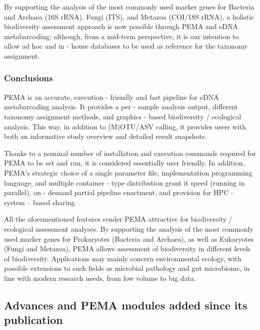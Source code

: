       By supporting the analysis of the most commonly used marker genes for Bacteria and Archaea (16S rRNA), Fungi (ITS), and Metazoa (COI/18S rRNA), a holistic biodiversity assessment approach is now possible through PEMA and eDNA metabarcoding; although, from a mid-term perspective, it is our intention to allow ad hoc and in - house databases to be used as reference for the taxonomy assignment.

   \subsubsection*{Conclusions}
   \label{subsec:pema-conclusion}

      PEMA is an accurate, execution - friendly and fast pipeline for eDNA metabarcoding analysis. 
      It provides a per - sample analysis output, different taxonomy assignment methods, and graphics - based biodiversity / ecological analysis. 
      This way, in addition to (M)OTU/ASV calling, it provides users with both an informative study overview and detailed result snapshots.

      Thanks to a nominal number of installation and execution commands required for PEMA to be set and run, it is considered essentially user friendly. 
      In addition, PEMA's strategic choice of a single parameter file, implementation programming language, and multiple container - type distribution grant it speed (running in parallel), on - demand partial pipeline enactment, and provision for HPC - system – based sharing.

      All the aforementioned features render PEMA attractive for biodiversity / ecological assessment analyses. 
      By supporting the analysis of the most commonly used marker genes for Prokaryotes (Bacteria and Archaea), as well as Eukaryotes (Fungi and Metazoa), PEMA allows assessment of biodiversity in different levels of biodiversity. 
      Applications may mainly concern environmental ecology, with possible extensions to such fields as microbial pathology and gut microbiome, in line with modern research needs, from low volume to big data.


   \subsection{Advances and PEMA modules added since its publication}

